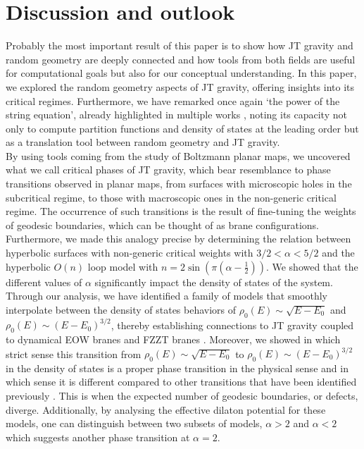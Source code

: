 \documentclass[a4paper,11pt]{article}
\begin{document}
\section{Discussion and outlook}\label{Section_Discussion}
Probably the most important result of this paper is to show how JT gravity and random geometry are deeply connected and how tools from both fields are useful for computational goals but also for our conceptual understanding. In this paper, we explored the random geometry aspects of JT gravity, offering insights into its critical regimes. 
Furthermore, we have remarked once again `the power of the string equation', already highlighted in multiple works \cite{Johnson:2019eik,Johnson:2021tnl,Turiaci:2020fjj}, noting its capacity not only to compute partition functions and density of states at the leading order but as a translation tool between random geometry and JT gravity. \\
By using tools coming from the study of Boltzmann planar maps, we uncovered what we call critical phases of JT gravity, which bear resemblance to phase transitions observed in planar maps, from surfaces with microscopic holes in the subcritical regime, to those with macroscopic ones in the non-generic critical regime. The occurrence of such transitions is the result of fine-tuning the weights of geodesic boundaries, which can be thought of as brane configurations. Furthermore, we made this analogy precise by determining the relation between hyperbolic surfaces with non-generic critical weights with $3/2<\alpha<5/2$ and the hyperbolic $O(n)$ loop model with $n=2\sin\left(\pi\left(\alpha-\frac{1}{2}\right)\right)$. We showed that the different values of $\alpha$ significantly impact the density of states of the system. Through our analysis, we have identified a family of models that smoothly interpolate between the density of states behaviors of $\rho_0(E)\sim\sqrt{E-E_0}$ and $\rho_0(E)\sim (E-E_0)^{3/2}$, thereby establishing connections to JT gravity coupled to dynamical EOW branes \cite{Gao:2021uro} and FZZT branes \cite{Okuyama:2021Page}. Moreover, we showed in which strict sense this transition from $\rho_0(E)\sim\sqrt{E-E_0}$ to $\rho_0(E)\sim (E-E_0)^{3/2}$ in the density of states is a proper phase transition in the physical sense and in which sense it is different compared to other transitions that have been identified previously \cite{Johnson:2020lns}. This is when the expected number of geodesic boundaries, or defects, diverge. Additionally, by analysing the effective dilaton potential for these models, one can distinguish between two subsets of models, $\alpha>2$ and $\alpha<2$ which suggests another phase transition at $\alpha=2$.\\
\end{document}
